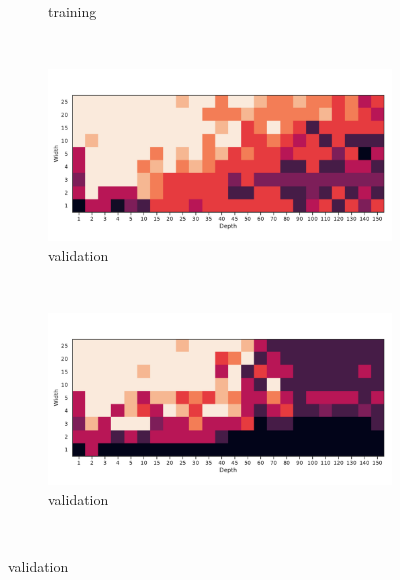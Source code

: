 \begin{figure}
\begin{subfigure}[b]{0.3\textwidth}
        \caption{\SepPoint training}
        \label{fig:moons_grid_p}
    \end{subfigure}
    ~ %
    \\
    \begin{subfigure}[b]{0.3\textwidth}
        \includegraphics[width=\textwidth]{img/moons_grid/val-acc-sep-u-0-0001.pdf}
        \caption{\SepUnit validation}
        \label{fig:moons_grid_u}
    \end{subfigure}
    ~ %
    \centering
    \begin{subfigure}[b]{0.3\textwidth}
        \includegraphics[width=\textwidth]{img/moons_grid/val-acc-sep-p-0-0001.pdf}
        \caption{\SepPoint validation}
        \label{fig:moons_grid_p}
    \end{subfigure}
    ~ %
    

\end{figure}
